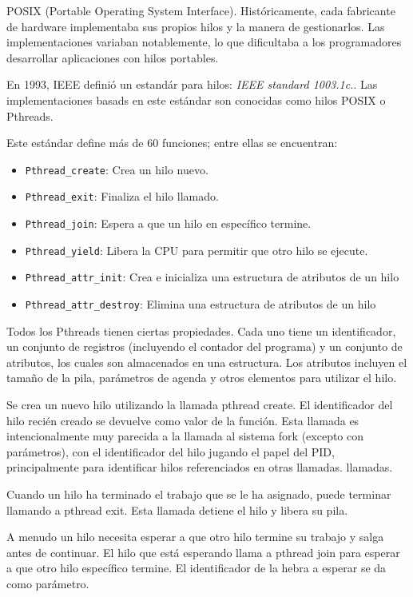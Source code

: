\documentclass[12pt, a4paper]{article} %
\begin{document}
POSIX (Portable Operating System Interface). Históricamente, cada fabricante de hardware implementaba sus propios hilos y la manera de gestionarlos. Las implementaciones variaban
notablemente, lo que dificultaba a los programadores desarrollar aplicaciones con hilos portables.

En 1993, IEEE definió un estandár para hilos: \textit{IEEE standard 1003.1c.}. Las implementaciones basads en este estándar son conocidas como hilos POSIX o Pthreads.

Este estándar define más de 60 funciones; entre ellas se encuentran:

\begin{itemize}
	\item \texttt{Pthread\_create}: Crea un hilo nuevo.
	\item \texttt{Pthread\_exit}: Finaliza el hilo llamado.
	\item \texttt{Pthread\_join}: Espera a que un hilo en específico termine.
	\item \texttt{Pthread\_yield}: Libera la CPU para permitir que otro hilo se ejecute.
	\item \texttt{Pthread\_attr\_init}: Crea e inicializa una estructura de atributos de un hilo
	\item \texttt{Pthread\_attr\_destroy}: Elimina una estructura de atributos de un hilo
\end{itemize}

Todos los Pthreads tienen ciertas propiedades. Cada uno tiene un identificador, un conjunto de registros (incluyendo  el contador del programa) y un conjunto de atributos, los cuales son almacenados en una estructura. Los atributos incluyen el tamaño de la pila, parámetros de agenda y otros elementos para utilizar el hilo.

Se crea un nuevo hilo utilizando la llamada pthread create. El identificador del hilo recién creado se devuelve como valor de la función. Esta llamada es intencionalmente muy parecida a la llamada al sistema fork (excepto con parámetros), con el identificador del hilo jugando el papel del PID, principalmente para identificar hilos referenciados en otras llamadas. llamadas.

Cuando un hilo ha terminado el trabajo que se le ha asignado, puede terminar llamando a pthread exit. Esta llamada detiene el hilo y libera su pila. 

A menudo un hilo necesita esperar a que otro hilo termine su trabajo y salga antes de continuar. El hilo que está esperando llama a pthread join para esperar a que otro hilo específico termine. El identificador de la hebra a esperar se da como parámetro. 
\end{document}
